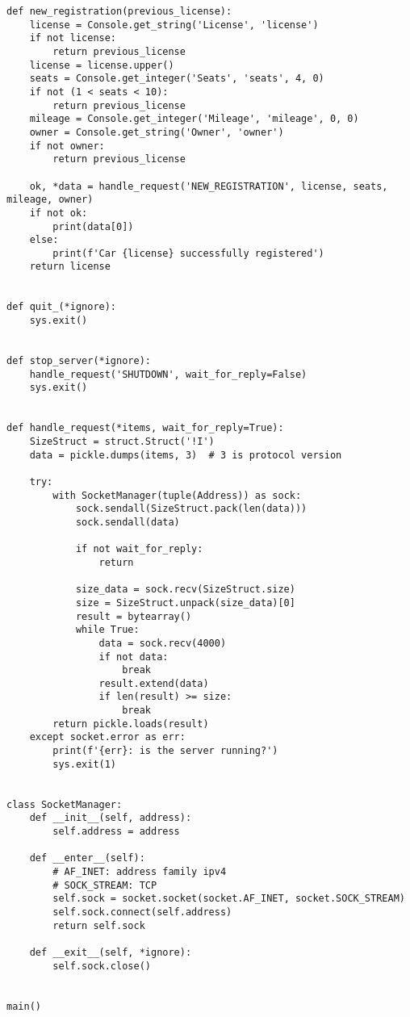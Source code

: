 \begin{lstlisting}
def new_registration(previous_license):
    license = Console.get_string('License', 'license')
    if not license:
        return previous_license
    license = license.upper()
    seats = Console.get_integer('Seats', 'seats', 4, 0)
    if not (1 < seats < 10):
        return previous_license
    mileage = Console.get_integer('Mileage', 'mileage', 0, 0)
    owner = Console.get_string('Owner', 'owner')
    if not owner:
        return previous_license

    ok, *data = handle_request('NEW_REGISTRATION', license, seats, mileage, owner)
    if not ok:
        print(data[0])
    else:
        print(f'Car {license} successfully registered')
    return license


def quit_(*ignore):
    sys.exit()


def stop_server(*ignore):
    handle_request('SHUTDOWN', wait_for_reply=False)
    sys.exit()


def handle_request(*items, wait_for_reply=True):
    SizeStruct = struct.Struct('!I')
    data = pickle.dumps(items, 3)  # 3 is protocol version

    try:
        with SocketManager(tuple(Address)) as sock:
            sock.sendall(SizeStruct.pack(len(data)))
            sock.sendall(data)

            if not wait_for_reply:
                return

            size_data = sock.recv(SizeStruct.size)
            size = SizeStruct.unpack(size_data)[0]
            result = bytearray()
            while True:
                data = sock.recv(4000)
                if not data:
                    break
                result.extend(data)
                if len(result) >= size:
                    break
        return pickle.loads(result)
    except socket.error as err:
        print(f'{err}: is the server running?')
        sys.exit(1)


class SocketManager:
    def __init__(self, address):
        self.address = address

    def __enter__(self):
        # AF_INET: address family ipv4
        # SOCK_STREAM: TCP
        self.sock = socket.socket(socket.AF_INET, socket.SOCK_STREAM)
        self.sock.connect(self.address)
        return self.sock

    def __exit__(self, *ignore):
        self.sock.close()


main()
  
\end{lstlisting}

